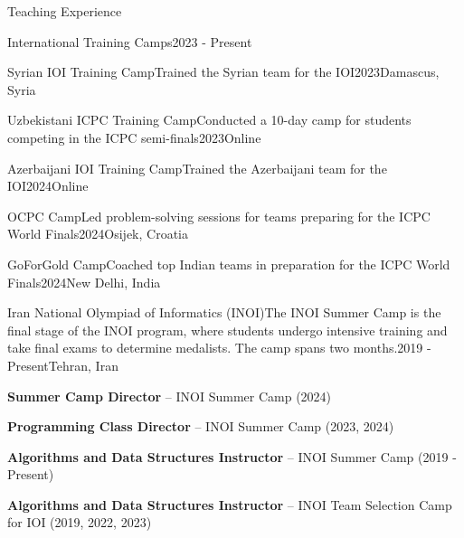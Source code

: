 
\begin{section}{Teaching Experience}

    \begin{subsectionnobullet}{International Training Camps}{}{2023 - Present}{}
    \end{subsectionnobullet}

    \begin{subsectionnobullet}{Syrian IOI Training Camp}{Trained the Syrian team for the IOI}{2023}{Damascus, Syria}
    \end{subsectionnobullet}

    \begin{subsectionnobullet}{Uzbekistani ICPC Training Camp}{Conducted a 10-day camp for students competing in the ICPC semi-finals}{2023}{Online}
    \end{subsectionnobullet}

    \begin{subsectionnobullet}{Azerbaijani IOI Training Camp}{Trained the Azerbaijani team for the IOI}{2024}{Online}
    \end{subsectionnobullet}

    \begin{subsectionnobullet}{OCPC Camp}{Led problem-solving sessions for teams preparing for the ICPC World Finals}{2024}{Osijek, Croatia}
    \end{subsectionnobullet}

    \begin{subsectionnobullet}{GoForGold Camp}{Coached top Indian teams in preparation for the ICPC World Finals}{2024}{New Delhi, India}
    \end{subsectionnobullet}

  \vspace{0.5cm}

  \begin{subsection}{Iran National Olympiad of Informatics (INOI)}{The INOI Summer Camp is the final stage of the INOI program, where students undergo intensive training and take final exams to determine medalists. The camp spans two months.}{2019 - Present}{Tehran, Iran}
    \item \textbf{Summer Camp Director} – INOI Summer Camp (2024)
    \item \textbf{Programming Class Director} – INOI Summer Camp (2023, 2024)
    \item \textbf{Algorithms and Data Structures Instructor} – INOI Summer Camp (2019 - Present)
    \item \textbf{Algorithms and Data Structures Instructor} – INOI Team Selection Camp for IOI (2019, 2022, 2023)
  \end{subsection}


\end{section}
